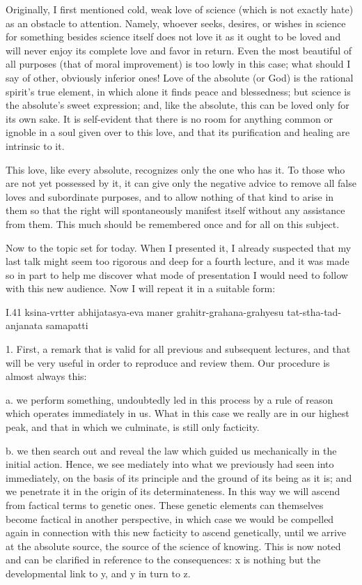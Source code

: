 Originally, I first mentioned cold, weak love of science
(which is not exactly hate) as an obstacle to attention.
Namely, whoever seeks, desires, or wishes in science
for something besides science itself does not love it
as it ought to be loved and will never enjoy
its complete love and favor in return.
Even the most beautiful of all purposes
(that of moral improvement)
is too lowly in this case;
what should I say of other, obviously inferior ones!
Love of the absolute (or God) is the rational spirit's true element,
in which alone it finds peace and blessedness;
but science is the absolute's sweet expression;
and, like the absolute, this can be loved only for its own sake.
It is self-evident that there is no room for anything
common or ignoble in a soul given over to this love,
and that its purification and healing are intrinsic to it.

This love, like every absolute,
recognizes only the one who has it.
To those who are not yet possessed by it,
it can give only the negative advice to remove
all false loves and subordinate purposes,
and to allow nothing of that kind to arise in them
so that the right will spontaneously manifest itself
without any assistance from them.
This much should be remembered
once and for all on this subject.

Now to the topic set for today.
When I presented it, I already suspected that
my last talk might seem too rigorous and
deep for a fourth lecture,
and it was made so in part to help me
discover what mode of presentation
I would need to follow with this new audience.
Now I will repeat it in a suitable form:

I.41
ksina-vrtter abhijatasya-eva maner
grahitr-grahana-grahyesu tat-stha-tad-anjanata samapatti

1. First, a remark that is valid
for all previous and subsequent lectures,
and that will be very useful in order
to reproduce and review them.
Our procedure is almost always this:

a. we perform something, undoubtedly led in this process
by a rule of reason which operates immediately in us.
What in this case we really are in our highest peak,
and that in which we culminate, is still only facticity.

b. we then search out and reveal the law
which guided us mechanically in the initial action.
Hence, we see mediately into what we previously
had seen into immediately,
on the basis of its principle
and the ground of its being as it is;
and we penetrate it in the origin
of its determinateness.
In this way we will ascend
from factical terms to genetic ones.
These genetic elements can themselves
become factical in another perspective,
in which case we would be compelled again
in connection with this new facticity
to ascend genetically,
until we arrive at the absolute source,
the source of the science of knowing.
This is now noted and can be clarified
in reference to the consequences:
x is nothing but the developmental link to y,
and y in turn to z.

